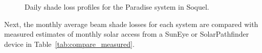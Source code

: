 \documentclass[twocolumn,10pt]{asme2ej}
\begin{document}
\begin{figure}[h!]
\begin{center}
\end{center}
\caption{Daily shade loss profiles for the Paradise system in Soquel.}
\label{fig:paradise_soquel_profiles}
\end{figure}

Next, the monthly average beam shade losses for each system are compared with measured estimates of monthly solar access from a SunEye or SolarPathfinder device in Table~\ref{tab:compare_measured}.
\end{document}
